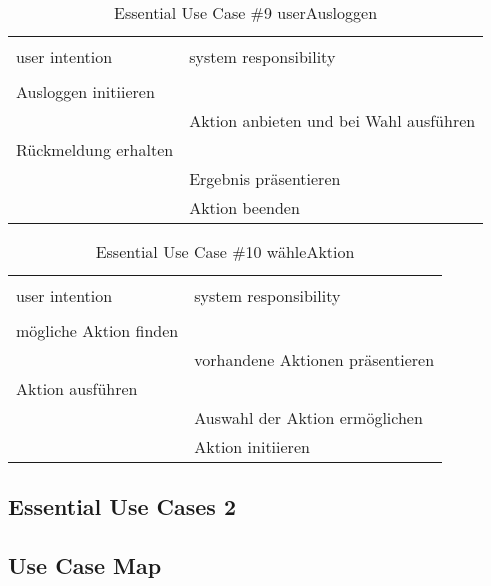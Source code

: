 \begin{table}[H]
\caption{Essential Use Case \#9 userAusloggen }
\centering
\begin{tabular}{l l}
\\ [-0.5ex]

\hline\hline
\\ [-0.5ex]
user intention & system responsibility
\\ [1.5ex]
\hline
\\ [-0.5ex]
Ausloggen initiieren		& 											 \\[1ex]
							& Aktion anbieten und bei Wahl ausführen	 \\[1ex]
Rückmeldung erhalten		&	     									 \\[1ex]
							& Ergebnis präsentieren			    		 \\[1ex]
							& Aktion beenden					    	 \\[1ex]

\hline
\end{tabular}
\label{tab:ausloggen}
\end{table}

\begin{table}[H]
\caption{Essential Use Case \#10 wähleAktion }
\centering
\begin{tabular}{l l}
\\ [-0.5ex]

\hline\hline
\\ [-0.5ex]
user intention & system responsibility
\\ [1.5ex]
\hline
\\ [-0.5ex]
mögliche Aktion finden			& 											\\[1ex]
								& vorhandene Aktionen präsentieren			\\[1ex]
Aktion ausführen 				& 											\\[1ex] 
								& Auswahl der Aktion ermöglichen			\\[1ex]
								& Aktion initiieren							\\[1ex]
\hline
\end{tabular}
\label{tab:aktionen}
\end{table}


\newpage
\subsection{Essential Use Cases 2}

\newpage
\subsection{Use Case Map}

